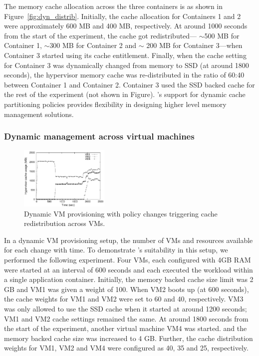 The \dd{} memory cache allocation across the three containers is as shown 
in Figure~\ref{fig:dyn_distrib}.
%
Initially, the cache allocation for Containers 1 and 2 were approximately 
600 MB and 400 MB,
respectively.
%
At around 1000 seconds from the start of the experiment, the \dd{} cache got 
redistributed--- $\sim$500 MB for Container 1, $\sim$300 MB  for Container 2 and
$\sim$ 200 MB for Container 3---when Container 3 started using its cache entitlement.
%
Finally, when the \dd{} cache setting for Container 3 was dynamically changed 
from memory to SSD (at around 1800 seconds), the hypervisor memory 
cache was re-distributed in the ratio of 60:40 between Container 1 and Container 2.
%
Container 3 used the SSD backed \dd{} cache for the rest of the 
experiment (not shown in Figure).
%
\dd's support for dynamic cache partitioning policies provides
flexibility in designing higher level memory management solutions. 

\subsubsection{Dynamic management across virtual machines}
\begin{figure}[t]
  \centering
\includegraphics[width=0.38\textwidth]{data/dynamic_vms/musage}
\vspace{-0.2cm}
 \caption{Dynamic VM provisioning with policy changes triggering \dd{} cache 
          redistribution across VMs.}
\vspace{-0.25cm}
 \label{fig:vm_distrib}
\end{figure} 
In a dynamic VM provisioning setup, the number of VMs and resources
available for each change with time.
%
To demonstrate \dd's suitability in this setup, we performed the
following experiment.
%
Four VMs, each configured with 4GB RAM were started at an
interval of 600 seconds and
each executed the \video{} workload within 
a single application container. 
%
Initially, the \dd{} memory backed cache size limit was 2 GB and VM1 
was given a weight of 100.
%
When VM2 boots up (at 600 seconds), the \dd{} cache weights 
for VM1 and VM2 were set to 60 and 40, respectively.
%
VM3 was only allowed to use the SSD cache when it started at around 1200 
seconds; VM1 and VM2 cache settings remained the same.
%
At around 1800 seconds from the start of the experiment, another
virtual machine VM4 was started.
and the \dd{} memory backed cache size was increased to 4 GB.
%
Further, the cache distribution weights for VM1, VM2 and VM4 
were configured as 40, 35 and 25, respectively.

